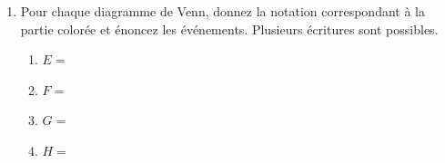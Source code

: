 \documentclass[main.tex]{subfiles}
\begin{document}
\begin{exercise}
\begin{enumerate}[label=\arabic*),leftmargin=*]
\begin{venndiagram3sets}[tikzoptions={scale=0.70,thick}]
	\end{venndiagram3sets}  
\item Pour chaque  diagramme de Venn, donnez la notation correspondant à la partie colorée et énoncez les événements. Plusieurs écritures sont possibles.  
\begin{enumerate}[label={},leftmargin=*] 
\item $E=$\dotfill 
\item $F=$\dotfill 
\item $G=$\dotfill 
\item $H=$\dotfill 
\end{enumerate} 
	\begin{venndiagram3sets}[tikzoptions={scale=0.75,thick}]
		 \fillBNotA
		 \fillCNotA
	\end{venndiagram3sets} \hfill 
	\begin{venndiagram3sets}[tikzoptions={scale=0.75,thick}] 
		\fillOnlyC
		\fillNotABC 
	\end{venndiagram3sets}\hfill 
	\begin{venndiagram3sets}[tikzoptions={scale=0.75,thick}]
		\fillOnlyC
	\end{venndiagram3sets} \hfill 
	\begin{venndiagram3sets}[tikzoptions={scale=0.75,thick}]
		\fillACapCNotB
	\end{venndiagram3sets}  
	
\end{enumerate} 
\end{exercise}
\end{document}

